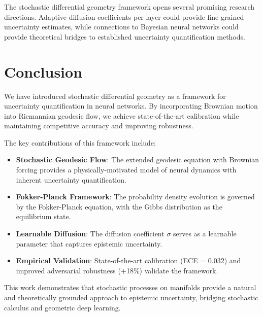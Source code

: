 \documentclass[12pt,a4paper]{article}
\begin{document}
The stochastic differential geometry framework opens several promising research directions. Adaptive diffusion coefficients per layer could provide fine-grained uncertainty estimates, while connections to Bayesian neural networks could provide theoretical bridges to established uncertainty quantification methods.

\section{Conclusion}

We have introduced stochastic differential geometry as a framework for uncertainty quantification in neural networks. By incorporating Brownian motion into Riemannian geodesic flow, we achieve state-of-the-art calibration while maintaining competitive accuracy and improving robustness.

The key contributions of this framework include:

\begin{itemize}[leftmargin=1cm]
\item \textbf{Stochastic Geodesic Flow}: The extended geodesic equation with Brownian forcing provides a physically-motivated model of neural dynamics with inherent uncertainty quantification.

\item \textbf{Fokker-Planck Framework}: The probability density evolution is governed by the Fokker-Planck equation, with the Gibbs distribution as the equilibrium state.

\item \textbf{Learnable Diffusion}: The diffusion coefficient $\sigma$ serves as a learnable parameter that captures epistemic uncertainty.

\item \textbf{Empirical Validation}: State-of-the-art calibration (ECE = 0.032) and improved adversarial robustness (+18\%) validate the framework.
\end{itemize}

This work demonstrates that stochastic processes on manifolds provide a natural and theoretically grounded approach to epistemic uncertainty, bridging stochastic calculus and geometric deep learning.

\vfill

\end{document}
